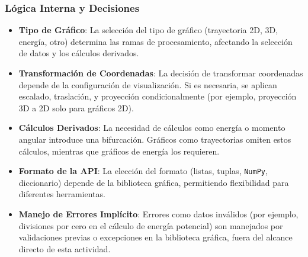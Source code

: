 \subsubsection{Lógica Interna y Decisiones}
\begin{itemize}
    \item \textbf{Tipo de Gráfico}: La selección del tipo de gráfico (trayectoria 2D, 3D, energía, otro) determina las ramas de procesamiento, afectando la selección de datos y los cálculos derivados.
    \item \textbf{Transformación de Coordenadas}: La decisión de transformar coordenadas depende de la configuración de visualización. Si es necesaria, se aplican escalado, traslación, y proyección condicionalmente (por ejemplo, proyección 3D a 2D solo para gráficos 2D).
    \item \textbf{Cálculos Derivados}: La necesidad de cálculos como energía o momento angular introduce una bifurcación. Gráficos como trayectorias omiten estos cálculos, mientras que gráficos de energía los requieren.
    \item \textbf{Formato de la API}: La elección del formato (listas, tuplas, \texttt{NumPy}, diccionario) depende de la biblioteca gráfica, permitiendo flexibilidad para diferentes herramientas.
    \item \textbf{Manejo de Errores Implícito}: Errores como datos inválidos (por ejemplo, divisiones por cero en el cálculo de energía potencial) son manejados por validaciones previas o excepciones en la biblioteca gráfica, fuera del alcance directo de esta actividad.
\end{itemize}

